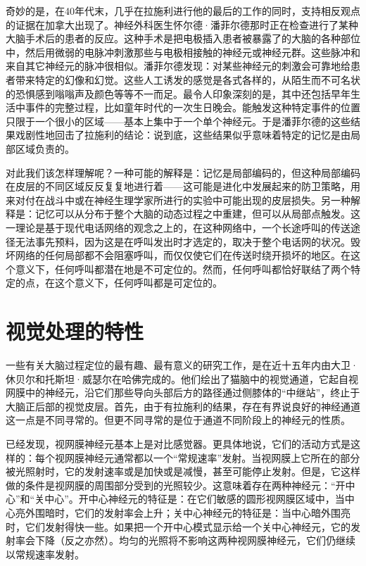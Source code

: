 奇妙的是，在40年代末，几乎在拉施利进行他的最后的工作的同时，支持相反观点的证据在加拿大出现了。神经外科医生怀尔德·潘菲尔德那时正在检查进行了某种大脑手术后的患者的反应。这种手术是把电极插入患者被暴露了的大脑的各种部位中，然后用微弱的电脉冲刺激那些与电极相接触的神经元或神经元群。这些脉冲和来自其它神经元的脉冲很相似。潘菲尔德发现：对某些神经元的刺激会可靠地给患者带来特定的幻像和幻觉。这些人工诱发的感觉是各式各样的，从陌生而不可名状的恐惧感到嗡嗡声及颜色等等不一而足。最令人印象深刻的是，其中还包括早年生活中事件的完整过程，比如童年时代的一次生日晚会。能触发这种特定事件的位置只限于一个很小的区域——基本上集中于一个单个神经元。于是潘菲尔德的这些结果戏剧性地回击了拉施利的结论：说到底，这些结果似乎意味着特定的记忆是由局部区域负责的。

对此我们该怎样理解呢？一种可能的解释是：记忆是局部编码的，但这种局部编码在皮层的不同区域反反复复地进行着——这可能是进化中发展起来的防卫策略，用来对付在战斗中或在神经生理学家所进行的实验中可能出现的皮层损失。另一种解释是：记忆可以从分布于整个大脑的动态过程之中重建，但可以从局部点触发。这一理论是基于现代电话网络的观念之上的，在这种网络中，一个长途呼叫的传送途径无法事先预料，因为这是在呼叫发出时才选定的，取决于整个电话网的状况。毁坏网络的任何局部都不会阻塞呼叫，而仅仅使它们在传送时绕开损坏的地区。在这个意义下，任何呼叫都潜在地是不可定位的。然而，任何呼叫都恰好联结了两个特定的点，在这个意义下，任何呼叫都是可定位的。

\section{视觉处理的特性}

一些有关大脑过程定位的最有趣、最有意义的研究工作，是在近十五年内由大卫·休贝尔和托斯坦·威瑟尔在哈佛完成的。他们绘出了猫脑中的视觉通道，它起自视网膜中的神经元，沿它们那些导向头部后方的路径通过侧膝体的“中继站”，终止于大脑正后部的视觉皮层。首先，由于有拉施利的结果，存在有界说良好的神经通道这一点是不同寻常的。但更不同寻常的是位于通道不同阶段上的神经元的性质。

已经发现，视网膜神经元基本上是对比感觉器。更具体地说，它们的活动方式是这样的：每个视网膜神经元通常都以一个“常规速率”发射。当视网膜上它所在的部分被光照射时，它的发射速率或是加快或是减慢，甚至可能停止发射。但是，它这样做的条件是视网膜的周围部分受到的光照较少。这意味着存在两种神经元：“开中心”和“关中心”。开中心神经元的特征是：在它们敏感的圆形视网膜区域中，当中心亮外围暗时，它们的发射率会上升；关中心神经元的特征是：当中心暗外围亮时，它们发射得快一些。如果把一个开中心模式显示给一个关中心神经元，它的发射率会下降（反之亦然）。均匀的光照将不影响这两种视网膜神经元，它们仍继续以常规速率发射。

